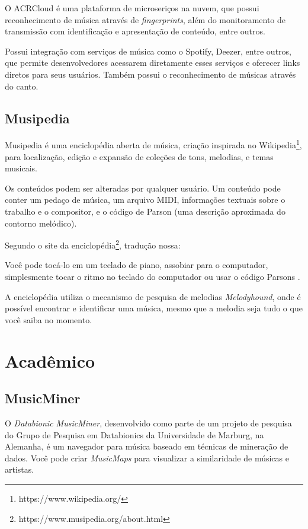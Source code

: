 O ACRCloud é uma plataforma de microseriços na nuvem, que possui reconhecimento de música através de \textit{fingerprints}, além do monitoramento de transmissão com identificação e apresentação de conteúdo, entre outros.

Possui integração com serviços de música como o Spotify, Deezer, entre outros, que permite desenvolvedores acessarem diretamente esses serviços e oferecer links diretos para seus usuários. Também possui o reconhecimento de músicas através do canto.

\subsection{Musipedia}
Musipedia é uma enciclopédia aberta de música, criação inspirada no Wikipedia\footnote{https://www.wikipedia.org/}, para localização, edição e expansão de coleções de tons, melodias, e temas musicais.

Os conteúdos podem ser alteradas por qualquer usuário. Um conteúdo pode conter um pedaço de música, um arquivo MIDI, informações textuais sobre o trabalho e o compositor, e o código de Parson (uma descrição aproximada do contorno melódico).

Segundo o site da enciclopédia\footnote{https://www.musipedia.org/about.html}, tradução nossa:

\begin{citacao}
[...]Você pode tocá-lo em um teclado de piano, assobiar para o computador, simplesmente tocar o ritmo no teclado do computador ou usar o código Parsons \cite{musipedia}.
\end{citacao}

A enciclopédia utiliza o mecanismo de pesquisa de melodias \textit{Melodyhound}, onde é possível encontrar e identificar uma música, mesmo que a melodia seja tudo o que você saiba no momento.

\section{Acadêmico}

\subsection{MusicMiner} \label{musicminer}
O \textit{Databionic MusicMiner}, desenvolvido como parte de um projeto de pesquisa do Grupo de Pesquisa em Databionics da Universidade de Marburg, na Alemanha, é um navegador para música baseado em técnicas de mineração de dados. Você pode criar \textit{MusicMaps} para visualizar a similaridade de músicas e artistas.

